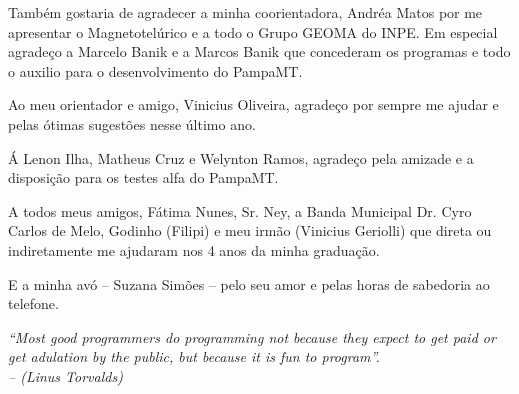 \documentclass[12pt,twoside,oneright,a4paper,chapter=TITLE,english,brazil]{unipampa}
\begin{document}
\begin{agradecimentos}
    \noindent Também gostaria de agradecer a minha coorientadora, Andréa Matos por me apresentar o Magnetotelúrico e a todo o Grupo GEOMA do INPE. Em especial agradeço a Marcelo Banik e a Marcos Banik que concederam os programas e todo o auxilio para o desenvolvimento do PampaMT.
    
    \SingleSpacing
    \OnehalfSpacing

    \noindent Ao meu orientador e amigo, Vinicius Oliveira, agradeço por sempre me ajudar e pelas ótimas sugestões nesse último ano.
    
    \SingleSpacing
    \OnehalfSpacing
    
    \noindent Á Lenon Ilha, Matheus Cruz e Welynton Ramos, agradeço pela amizade e a disposição para os testes alfa do PampaMT.
    
    \SingleSpacing
    \OnehalfSpacing
    
    \noindent A todos meus amigos, Fátima Nunes, Sr. Ney, a Banda Municipal Dr. Cyro Carlos de Melo, Godinho (Filipi) e meu irmão (Vinicius Geriolli) que direta ou indiretamente me ajudaram nos 4 anos da minha graduação. 
   
    \SingleSpacing
    \OnehalfSpacing
   
    \noindent E a minha avó -- Suzana Simões -- pelo seu amor e pelas horas de sabedoria ao telefone.
    
\end{agradecimentos}


\begin{epigrafe}
    \textit{``Most good programmers do programming not because they expect to get paid or get adulation by the public, but because it is fun to program''.
    \DoubleSpacing \\
    -- (Linus Torvalds)}
\end{epigrafe}
\end{document}
